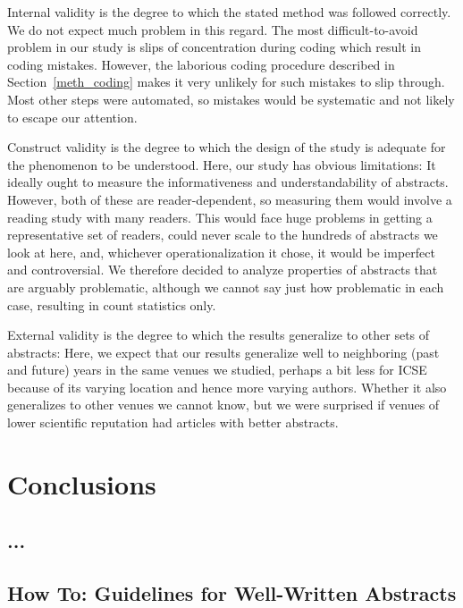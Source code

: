 \documentclass[10pt,journal,compsoc]{IEEEtran}
\begin{document}
Internal validity is the degree to which the stated method 
was followed correctly.
We do not expect much problem in this regard.
The most difficult-to-avoid problem in our study is slips of concentration
during coding which result in coding mistakes.
However, the laborious coding procedure 
described in Section~\ref{meth_coding}
makes it very unlikely for such mistakes to slip through.
Most other steps were automated, so mistakes would be systematic
and not likely to escape our attention.

Construct validity is the degree to which the design
of the study is adequate for the phenomenon to be understood.
Here, our study has obvious limitations:
It ideally ought to measure the informativeness and understandability of 
abstracts. However, both of these are reader-dependent, so
measuring them would involve a reading study with many readers.
This would face huge problems in getting a representative set of readers,
could never scale to the hundreds of abstracts we look at here,
and, whichever operationalization it chose, 
it would be imperfect and controversial.
We therefore decided to analyze properties of abstracts
that are arguably problematic, although we cannot say just how
problematic in each case, resulting in count statistics only.

External validity is the degree to which the results generalize
to other sets of abstracts:
Here, we expect that our results generalize well to 
neighboring (past and future) years in the same venues
we studied, perhaps a bit less for ICSE because of its 
varying location and hence more varying authors.
Whether it also generalizes to other venues
we cannot know, but we were surprised if venues of lower
scientific reputation had articles with better abstracts.


\section{Conclusions}


\subsection{...}
\noindent


\subsection{How To: Guidelines for Well-Written Abstracts}
\end{document}
